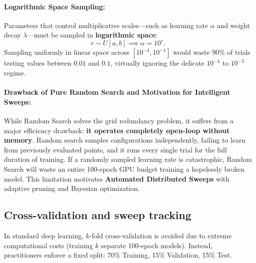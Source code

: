 \paragraph{Logarithmic Space Sampling:}
Parameters that control multiplicative scales---such as learning rate $\alpha$ and weight decay $\lambda$---must be sampled in \textbf{logarithmic space}:
\begin{equation}
r \sim U[a, b] \implies \alpha = 10^r.
\label{eq:logarithmic_sampling}
\end{equation}
Sampling uniformly in linear space across $[10^{-4}, 10^{-1}]$ would waste 90\% of trials testing values between $0.01$ and $0.1$, virtually ignoring the delicate $10^{-4}$ to $10^{-3}$ regime.

\paragraph{Drawback of Pure Random Search and Motivation for Intelligent Sweeps:}
While Random Search solves the grid redundancy problem, it suffers from a major efficiency drawback: \textbf{it operates completely open-loop without memory}. Random search samples configurations independently, failing to learn from previously evaluated points, and it runs every single trial for the full duration of training. If a randomly sampled learning rate is catastrophic, Random Search will waste an entire 100-epoch GPU budget training a hopelessly broken model. This limitation motivates \textbf{Automated Distributed Sweeps} with adaptive pruning and Bayesian optimization.

\subsection{Cross-validation and sweep tracking}
\label{sec:sweeps_wandb}

In standard deep learning, $k$-fold cross-validation is avoided due to extreme computational costs (training $k$ separate 100-epoch models). Instead, practitioners enforce a fixed split: 70\% Training, 15\% Validation, 15\% Test.


